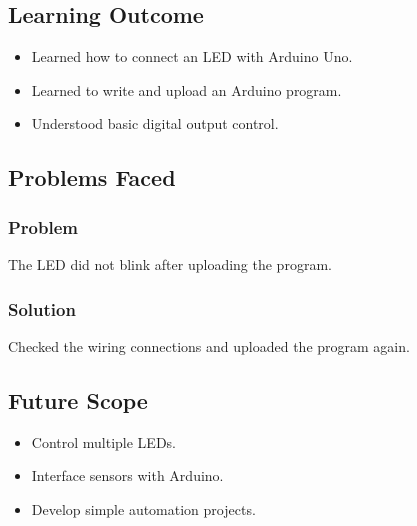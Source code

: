 \documentclass[12pt,a4paper]{report}
\begin{document}
\subsection{Learning Outcome}

\begin{itemize}

\item Learned how to connect an LED with Arduino Uno.

\item Learned to write and upload an Arduino program.

\item Understood basic digital output control.

\end{itemize}

\subsection{Problems Faced}

\subsubsection{Problem}

The LED did not blink after uploading the program.


\subsubsection{Solution}

Checked the wiring connections and uploaded the program again.

\subsection{Future Scope}

\begin{itemize}

\item Control multiple LEDs.

\item Interface sensors with Arduino.

\item Develop simple automation projects.

\end{itemize}

\thispagestyle{githubpage}
\end{document}
